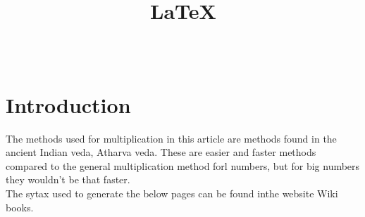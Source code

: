 \documentclass[12pt,a4paper]{article}
\title{\LaTeX}
\author{
	\hspace{4in}{Dheeraj Athrey}\\
}
\begin{document}
\maketitle


\section*{Introduction}
The methods used for multiplication in this article are methods found in the ancient Indian veda, Atharva veda\cite{bloomfield1899atharvaveda}\cite{India1000shaping}. These are easier and faster methods compared to the general multiplication method forl numbers, but for big numbers they wouldn't be that faster.\\
The sytax used to generate the below pages can be found inthe website Wiki books\cite{website:Wikibooks}.\\






\end{document}
